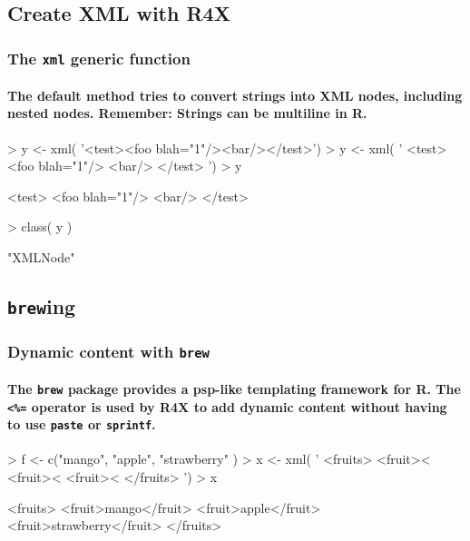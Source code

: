 \documentclass[smaller]{beamer}
\newcommand{\rfun}[1]{\texttt{#1}}
\begin{document}
\subsection{Create XML with R4X}
\begin{frame}[fragile]
\frametitle{The \rfun{xml} generic function}
\framesubtitle{The default method tries to convert strings into XML nodes, including nested nodes. Remember: Strings can be multiline in R.}
\begin{Schunk}
\begin{Sinput}
> y <- xml( '<test><foo blah="1"/><bar/></test>')
> y <- xml( '
    <test>
       <foo blah="1"/>
       <bar/>
    </test>
  ')
> y
\end{Sinput}
\begin{Soutput}
<test>
 <foo blah="1"/>
 <bar/>
</test>
\end{Soutput}
\begin{Sinput}
> class( y )
\end{Sinput}
\begin{Soutput}
[1] "XMLNode"
\end{Soutput}
\end{Schunk}
\end{frame}

\subsection{\texttt{brew}ing}
\begin{frame}[fragile]
\frametitle{Dynamic content with \rfun{brew}}
\framesubtitle{The \rfun{brew} package provides a psp-like templating framework for R. The \texttt{<\%=} operator is used by R4X to add dynamic content without
having to use \rfun{paste} or \rfun{sprintf}. } 
\begin{Schunk}
\begin{Sinput}
> f <- c("mango", "apple", "strawberry" )
> x <- xml( '
    <fruits>
      <fruit><%
      <fruit><%
      <fruit><%
    </fruits>
  ')
> x 
\end{Sinput}
\begin{Soutput}
<fruits>
 <fruit>mango</fruit>
 <fruit>apple</fruit>
 <fruit>strawberry</fruit>
</fruits>
\end{Soutput}
\end{Schunk}
\end{frame}
\end{document}
